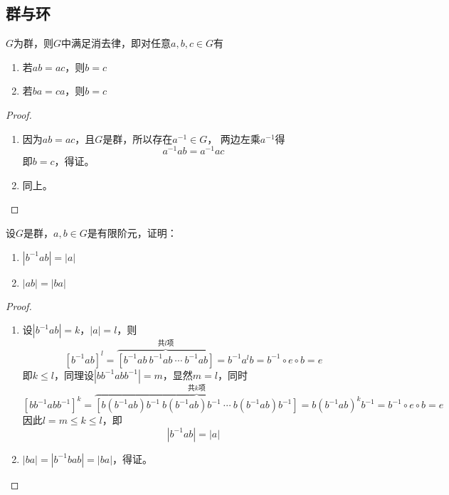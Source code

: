 \subsection{群与环}

\begin{theorem}

    $G$为群，则$G$中满足消去律，即对任意$a,b,c \in G$有
    \begin{enumerate}

        \item 若$ab = ac$，则$b = c$
        \item 若$ba = ca$，则$b = c$
        
    \end{enumerate}

\end{theorem}

\begin{proof}

    \begin{enumerate}

        \item 
            因为$ab = ac$，且$G$是群，所以存在$a^{-1} \in G$， 两边左乘$a^{-1}$得
            $$a^{-1} ab = a^{-1}ac$$
            即$b = c$，得证。
        \item 同上。
        
    \end{enumerate}

\end{proof}

\begin{proposition}

    设$G$是群，$a,b\in G$是有限阶元，证明：

    \begin{enumerate}

        \item $|b^{-1}ab| = |a|$
        \item $|ab| = |ba|$
        
    \end{enumerate}

\end{proposition}

\begin{proof}

    \begin{enumerate}

        \item 
            设$|b^{-1}ab| = k$，$|a| = l$，则
            $$[b^{-1}ab]^l = \overbrace{[b^{-1}ab \  b^{-1}ab \ \cdots \  b^{-1}ab]}^{共l项} = b^{-1}a^{l}b = b^{-1}\circ e \circ b = e$$
            即$k \leq l$，同理设$|bb^{-1}abb^{-1}| = m$，显然$m = l$，同时
            $$[bb^{-1}abb^{-1}]^k = \overbrace{[b(b^{-1}ab)b^{-1} \  b(b^{-1}ab)b^{-1} \ \cdots \  b(b^{-1}ab)b^{-1}]}^{共k项} = b(b^{-1}ab)^kb^{-1} = b^{-1}\circ e \circ b = e$$
            因此$l = m \leq k \leq l$，即
            $$|b^{-1}ab| = |a|$$
        \item 
            $|ba| = |b^{-1}bab| = |ba|$，得证。
        
    \end{enumerate}

\end{proof}

